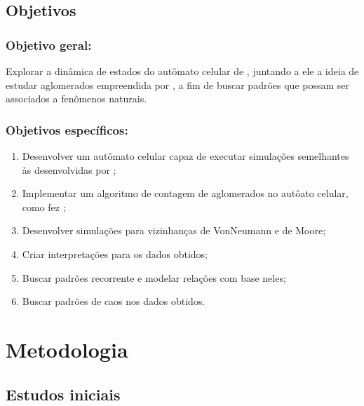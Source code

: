 \documentclass[
	12pt,				%
	openright,			%
	twoside,			%
	a4paper,			%
	english,			%
	french,				%
	spanish,			%
	brazil				%
	]{abntex2}
\begin{document}
\section*{Objetivos}


\subsection*{Objetivo geral:}
Explorar a dinâmica de estados do autômato celular de , juntando a ele a ideia de estudar aglomerados empreendida por , a fim de buscar padrões que possam ser associados a fenômenos naturais.

\subsection*{Objetivos específicos:}
\begin{enumerate}
  \item Desenvolver um autômato celular capaz de executar simulações semelhantes às desenvolvidas por ;
  \item Implementar um algoritmo de contagem de aglomerados no autôato celular, como fez ;
  \item Desenvolver simulações para vizinhanças de VonNeumann e de Moore;
  \item Criar interpretações para os dados obtidos;
  \item Buscar padrões recorrente e modelar relações com base neles;
  \item Buscar padrões de caos nos dados obtidos.
\end{enumerate}


\chapter{Metodologia}

\section{Estudos iniciais}
\end{document}
